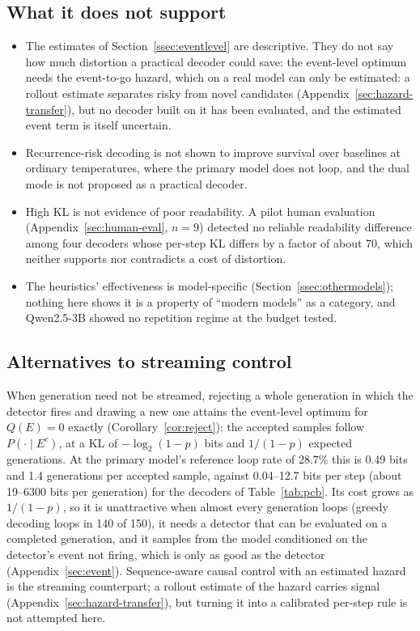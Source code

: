 \documentclass[11pt]{article}
\begin{document}
\subsection{What it does not support}
\begin{itemize}[leftmargin=*]
  \item The estimates of Section~\ref{ssec:eventlevel} are descriptive. They do not say how much distortion a practical decoder could save: the event-level optimum needs the event-to-go hazard, which on a real model can only be estimated: a rollout estimate separates risky from novel candidates (Appendix~\ref{sec:hazard-transfer}), but no decoder built on it has been evaluated, and the estimated event term is itself uncertain.
  \item Recurrence-risk decoding is not shown to improve survival over baselines at ordinary temperatures, where the primary model does not loop, and the dual mode is not proposed as a practical decoder.
  \item High KL is not evidence of poor readability. A pilot human evaluation (Appendix~\ref{sec:human-eval}, $n{=}9$) detected no reliable readability difference among four decoders whose per-step KL differs by a factor of about 70, which neither supports nor contradicts a cost of distortion.
  \item The heuristics' effectiveness is model-specific (Section~\ref{ssec:othermodels}); nothing here shows it is a property of ``modern models'' as a category, and Qwen2.5-3B showed no repetition regime at the budget tested.
\end{itemize}

\subsection{Alternatives to streaming control}
\label{ssec:alternatives}
When generation need not be streamed, rejecting a whole generation in which the detector fires and drawing a new one attains the event-level optimum for $Q(E)=0$ exactly (Corollary~\ref{cor:reject}): the accepted samples follow $P(\cdot\mid E^c)$, at a KL of $-\log_2(1-p)$ bits and $1/(1-p)$ expected generations. At the primary model's reference loop rate of 28.7\% this is 0.49 bits and 1.4 generations per accepted sample, against 0.04--12.7 bits per step (about 19--6300 bits per generation) for the decoders of Table~\ref{tab:pcb}. Its cost grows as $1/(1-p)$, so it is unattractive when almost every generation loops (greedy decoding loops in 140 of 150), it needs a detector that can be evaluated on a completed generation, and it samples from the model conditioned on the detector's event not firing, which is only as good as the detector (Appendix~\ref{sec:event}). Sequence-aware causal control with an estimated hazard is the streaming counterpart; a rollout estimate of the hazard carries signal (Appendix~\ref{sec:hazard-transfer}), but turning it into a calibrated per-step rule is not attempted here.
\end{document}

